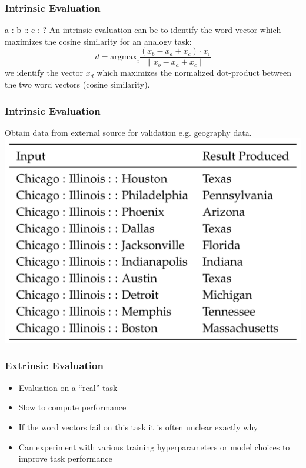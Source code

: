 \begin{frame}
	\frametitle{Intrinsic Evaluation}
	\begin{block}{a : b :: c : ?}
	An intrinsic evaluation can be to identify the word vector which maximizes the cosine similarity for an analogy task:
	\[ d = \textrm{argmax}_i \frac{ (x_b - x_a + x_c) \cdot x_i }{ \| x_b - x_a + x_c \| } \]	
	we identify the vector $x_d$ which maximizes the normalized dot-product between the two word vectors (cosine similarity).	
	\end{block}
\end{frame}

\begin{frame}
	\frametitle{Intrinsic Evaluation}
Obtain data from external source for validation e.g. geography data.
	\centering
	\includegraphics[scale=0.4]{figures/wordvectors/intrinsiceval1.png}
\end{frame}


\begin{frame}
	\frametitle{Extrinsic Evaluation}
	\begin{itemize}[<+->]
		\item Evaluation on a ``real'' task
		\item Slow to compute performance
		\item If the word vectors fail on this task it is often unclear exactly why
		\item Can experiment with various training hyperparameters or model choices to improve task performance
	\end{itemize}
\end{frame}

